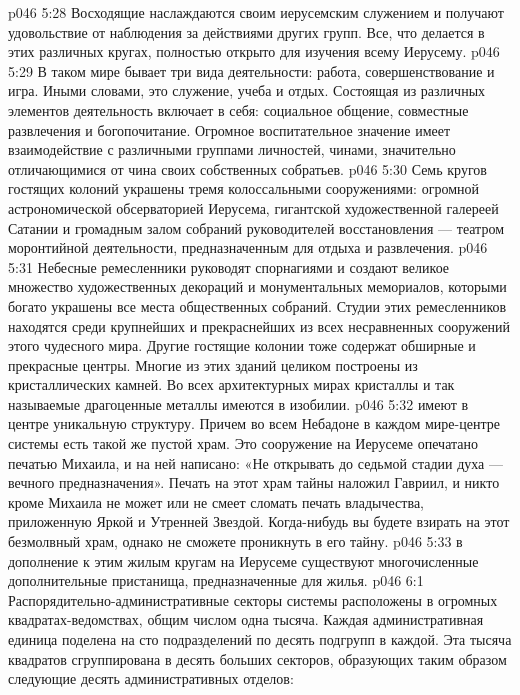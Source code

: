 \vs p046 5:28 Восходящие наслаждаются своим иерусемским служением и получают удовольствие от наблюдения за действиями других групп. Все, что делается в этих различных кругах, полностью открыто для изучения всему Иерусему.
\vs p046 5:29 В таком мире бывает три вида деятельности: работа, совершенствование и игра. Иными словами, это служение, учеба и отдых. Состоящая из различных элементов деятельность включает в себя: социальное общение, совместные развлечения и богопочитание. Огромное воспитательное значение имеет взаимодействие с различными группами личностей, чинами, значительно отличающимися от чина своих собственных собратьев.
\vs p046 5:30 \bibnobreakspace {} Семь кругов гостящих колоний украшены тремя колоссальными сооружениями: огромной астрономической обсерваторией Иерусема, гигантской художественной галереей Сатании и громадным залом собраний руководителей восстановления --- театром моронтийной деятельности, предназначенным для отдыха и развлечения.
\vs p046 5:31 Небесные ремесленники руководят спорнагиями и создают великое множество художественных декораций и монументальных мемориалов, которыми богато украшены все места общественных собраний. Студии этих ремесленников находятся среди крупнейших и прекраснейших из всех несравненных сооружений этого чудесного мира. Другие гостящие колонии тоже содержат обширные и прекрасные центры. Многие из этих зданий целиком построены из кристаллических камней. Во всех архитектурных мирах кристаллы и так называемые драгоценные металлы имеются в изобилии.
\vs p046 5:32 \bibnobreakspace {} имеют в центре уникальную структуру. Причем во всем Небадоне в каждом мире\hyp{}центре системы есть такой же пустой храм. Это сооружение на Иерусеме опечатано печатью Михаила, и на ней написано: «Не открывать до седьмой стадии духа --- вечного предназначения». Печать на этот храм тайны наложил Гавриил, и никто кроме Михаила не может или не смеет сломать печать владычества, приложенную Яркой и Утренней Звездой. Когда\hyp{}нибудь вы будете взирать на этот безмолвный храм, однако не сможете проникнуть в его тайну.
\vs p046 5:33 \pc {} в дополнение к этим жилым кругам на Иерусеме существуют многочисленные дополнительные пристанища, предназначенные для жилья.
\vs p046 6:1 Распорядительно\hyp{}административные секторы системы расположены в огромных квадратах\hyp{}ведомствах, общим числом одна тысяча. Каждая административная единица поделена на сто подразделений по десять подгрупп в каждой. Эта тысяча квадратов сгруппирована в десять больших секторов, образующих таким образом следующие десять административных отделов:
